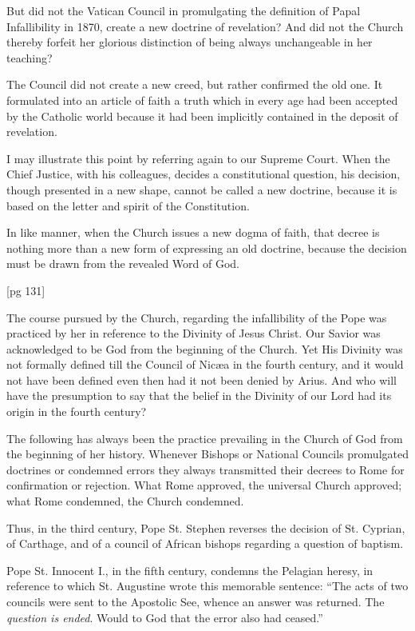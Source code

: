 But did not the Vatican Council in promulgating
the definition of Papal Infallibility in 1870, create a
new doctrine of revelation? And did not the
Church thereby forfeit her glorious distinction of
being always unchangeable in her teaching?

The Council did not create a new creed, but
rather confirmed the old one. It formulated into
an article of faith a truth which in every age had
been accepted by the Catholic world because it had
been implicitly contained in the deposit of revelation.

I may illustrate this point by referring again to
our Supreme Court. When the Chief Justice, with
his colleagues, decides a constitutional question,
his decision, though presented in a new shape, cannot
be called a new doctrine, because it is based on
the letter and spirit of the Constitution.

In like manner, when the Church issues a new
dogma of faith, that decree is nothing more than
a new form of expressing an old doctrine, because
the decision must be drawn from the revealed
Word of God.

[pg 131]

The course pursued by the Church, regarding
the infallibility of the Pope was practiced by her
in reference to the Divinity of Jesus Christ. Our
Savior was acknowledged to be God from the beginning
of the Church. Yet His Divinity was not
formally defined till the Council of Nicæa in the
fourth century, and it would not have been defined
even then had it not been denied by Arius. And
who will have the presumption to say that the belief
in the Divinity of our Lord had its origin in
the fourth century?

The following has always been the practice prevailing
in the Church of God from the beginning
of her history. Whenever Bishops or National
Councils promulgated doctrines or condemned errors
they always transmitted their decrees to
Rome for confirmation or rejection. What Rome
approved, the universal Church approved; what
Rome condemned, the Church condemned.

Thus, in the third century, Pope St. Stephen
reverses the decision of St. Cyprian, of Carthage,
and of a council of African bishops regarding a
question of baptism.

Pope St. Innocent I., in the fifth century, condemns
the Pelagian heresy, in reference to which
St. Augustine wrote this memorable sentence:
“The acts of two councils were sent to the Apostolic
See, whence an answer was returned. The
\emph{question is ended}. Would to God that the error
also had ceased.”

